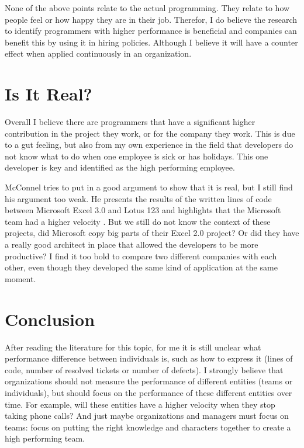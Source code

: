 None of the above points relate to the actual programming.
They relate to how people feel or how happy they are in their job.
Therefor, I do believe the research to identify programmers with higher performance is beneficial and companies can benefit this by using it in hiring policies.
Although I believe it will have a counter effect when applied continuously in an organization.

\section*{Is It Real?}

Overall I believe there are programmers that have a significant higher contribution in the project they work, or for the company they work.
This is due to a gut feeling, but also from my own experience in the field that developers do not know what to do when one employee is sick or has holidays.
This one developer is key and identified as the high performing employee.

McConnel tries to put in a good argument to show that it is real, but I still find his argument too weak.
He presents the results of the written lines of code between Microsoft Excel 3.0 and Lotus 123 and highlights that the Microsoft team had a higher velocity \autocite[572]{MAKING_SOFTWARE}.
But we still do not know the context of these projects, did Microsoft copy big parts of their Excel 2.0 project?
Or did they have a really good architect in place that allowed the developers to be more productive?
I find it too bold to compare two different companies with each other, even though they developed the same kind of application at the same moment.

\section*{Conclusion}

After reading the literature for this topic, for me it is still unclear what performance difference between individuals is,
such as how to express it (lines of code, number of resolved tickets or number of defects).
I strongly believe that organizations should not measure the performance of different entities (teams or individuals),
but should focus on the performance of these different entities over time.
For example, will these entities have a higher velocity when they stop taking phone calls?
And just maybe organizations and managers must focus on teams: focus on putting the right knowledge and characters together to create a high performing team.